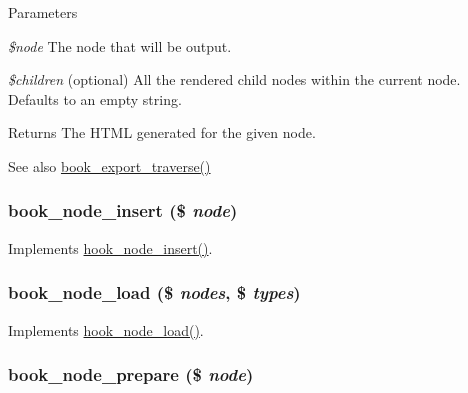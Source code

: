 \begin{DoxyParams}{Parameters}
\item[{\em \$node}]The node that will be output. \item[{\em \$children}](optional) All the rendered child nodes within the current node. Defaults to an empty string.\end{DoxyParams}
\begin{DoxyReturn}{Returns}
The HTML generated for the given node.
\end{DoxyReturn}
\begin{DoxySeeAlso}{See also}
\hyperlink{book_8module_a3cbdd5e26bcca034837e7a4b04f6641b}{book\_\-export\_\-traverse()} 
\end{DoxySeeAlso}
\hypertarget{book_8module_a081b24827473612bc5d7f7f918a4951a}{
\subsubsection[{book\_\-node\_\-insert}]{\setlength{\rightskip}{0pt plus 5cm}book\_\-node\_\-insert (\$ {\em node})}}
\label{book_8module_a081b24827473612bc5d7f7f918a4951a}
Implements \hyperlink{group__node__api__hooks_ga8b40dc62e46e5055c205d2a723dc3548}{hook\_\-node\_\-insert()}. \hypertarget{book_8module_afc9ff07141ded33f80ec193bf7d2da5a}{
\subsubsection[{book\_\-node\_\-load}]{\setlength{\rightskip}{0pt plus 5cm}book\_\-node\_\-load (\$ {\em nodes}, \/  \$ {\em types})}}
\label{book_8module_afc9ff07141ded33f80ec193bf7d2da5a}
Implements \hyperlink{group__node__api__hooks_gad48bb14b68ed38526029d1f7ac2d2de4}{hook\_\-node\_\-load()}. \hypertarget{book_8module_a8a8ea6d87c29a8bf3e88ade3f1df6551}{
\subsubsection[{book\_\-node\_\-prepare}]{\setlength{\rightskip}{0pt plus 5cm}book\_\-node\_\-prepare (\$ {\em node})}}
